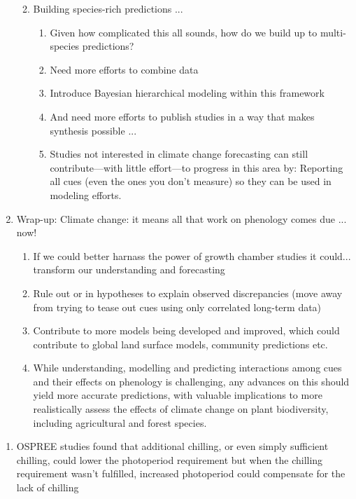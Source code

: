 \documentclass[11pt,letterpaper]{article}
\begin{document}
\begin{enumerate}
\begin{enumerate}
\begin{enumerate}
\begin{enumerate}
\end{enumerate}
\end{enumerate}
\item Building species-rich predictions ... 
\begin{enumerate}
\item Given how complicated this all sounds, how do we build up to multi-species predictions?
\item Need more efforts to combine data
\item Introduce Bayesian hierarchical modeling within this framework
\item And need more efforts to publish studies in a way that makes synthesis possible ...
\item Studies not interested in climate change forecasting can still contribute---with little effort---to progress in this area by: Reporting all cues (even the ones you don't measure) so they can be used in modeling efforts. 
\end{enumerate}
\end{enumerate}
\item Wrap-up: Climate change: it means all that work on phenology comes due ... now!
\begin{enumerate}
\item If we could better harnass the power of growth chamber studies it could... transform our understanding and forecasting
\item Rule out or in hypotheses to explain observed discrepancies (move away from trying to tease out cues using only correlated long-term data)
\item Contribute to more models being developed and improved, which could contribute to global land surface models, community predictions etc. 
\item While understanding, modelling and predicting interactions among cues and their effects on phenology is challenging, any advances on this should yield more accurate predictions, with valuable implications to more realistically assess the effects of climate change on plant biodiversity, including agricultural and forest species. %
\end{enumerate}
\end{enumerate}

\begin{enumerate}
\item OSPREE studies found that additional chilling, or even simply sufficient chilling, could lower the photoperiod requirement but when the chilling requirement wasn't fulfilled, increased photoperiod could compensate for the lack of chilling \citep{Nienstaedt:1966aa,Myking:1995,Falusi:1996aa,Hawkins:2012}
\end{enumerate}
\end{document}
